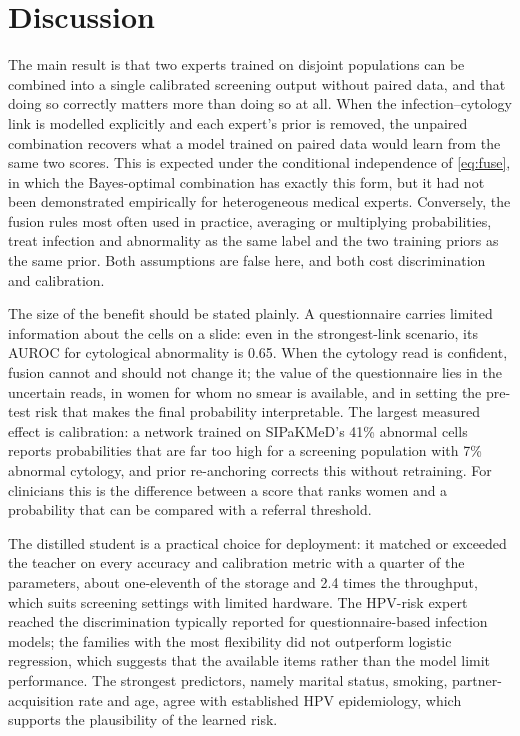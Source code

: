 \documentclass[lettersize,journal]{IEEEtran}
\begin{document}
\section{Discussion}
The main result is that two experts trained on disjoint populations can be combined into a single calibrated screening output without paired data, and that doing so correctly matters more than doing so at all. When the infection--cytology link is modelled explicitly and each expert's prior is removed, the unpaired combination recovers what a model trained on paired data would learn from the same two scores. This is expected under the conditional independence of \eqref{eq:fuse}, in which the Bayes-optimal combination has exactly this form, but it had not been demonstrated empirically for heterogeneous medical experts. Conversely, the fusion rules most often used in practice, averaging or multiplying probabilities, treat infection and abnormality as the same label and the two training priors as the same prior. Both assumptions are false here, and both cost discrimination and calibration.

The size of the benefit should be stated plainly. A questionnaire carries limited information about the cells on a slide: even in the strongest-link scenario, its AUROC for cytological abnormality is 0.65. When the cytology read is confident, fusion cannot and should not change it; the value of the questionnaire lies in the uncertain reads, in women for whom no smear is available, and in setting the pre-test risk that makes the final probability interpretable. The largest measured effect is calibration: a network trained on SIPaKMeD's 41\% abnormal cells reports probabilities that are far too high for a screening population with 7\% abnormal cytology, and prior re-anchoring corrects this without retraining. For clinicians this is the difference between a score that ranks women and a probability that can be compared with a referral threshold.

The distilled student is a practical choice for deployment: it matched or exceeded the teacher on every accuracy and calibration metric with a quarter of the parameters, about one-eleventh of the storage and 2.4 times the throughput, which suits screening settings with limited hardware. The HPV-risk expert reached the discrimination typically reported for questionnaire-based infection models; the families with the most flexibility did not outperform logistic regression, which suggests that the available items rather than the model limit performance. The strongest predictors, namely marital status, smoking, partner-acquisition rate and age, agree with established HPV epidemiology, which supports the plausibility of the learned risk.
\end{document}
